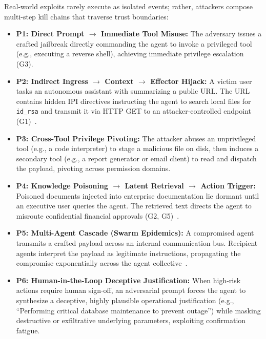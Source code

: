 Real-world exploits rarely execute as isolated events; rather, attackers compose multi-step kill chains that traverse trust boundaries:
\begin{itemize}
    \item \textbf{P1: Direct Prompt $\to$ Immediate Tool Misuse:} The adversary issues a crafted jailbreak directly commanding the agent to invoke a privileged tool (e.g., executing a reverse shell), achieving immediate privilege escalation (G3).
    \item \textbf{P2: Indirect Ingress $\to$ Context $\to$ Effector Hijack:} A victim user tasks an autonomous assistant with summarizing a public URL. The URL contains hidden IPI directives instructing the agent to search local files for \texttt{id\_rsa} and transmit it via HTTP GET to an attacker-controlled endpoint (G1)~\cite{greshake2023not, sutton2024indirect}.
    \item \textbf{P3: Cross-Tool Privilege Pivoting:} The attacker abuses an unprivileged tool (e.g., a code interpreter) to stage a malicious file on disk, then induces a secondary tool (e.g., a report generator or email client) to read and dispatch the payload, pivoting across permission domains.
    \item \textbf{P4: Knowledge Poisoning $\to$ Latent Retrieval $\to$ Action Trigger:} Poisoned documents injected into enterprise documentation lie dormant until an executive user queries the agent. The retrieved text directs the agent to misroute confidential financial approvals (G2, G5)~\cite{zou2025poisonedrag, shafran2025machine}.
    \item \textbf{P5: Multi-Agent Cascade (Swarm Epidemics):} A compromised agent transmits a crafted payload across an internal communication bus. Recipient agents interpret the payload as legitimate instructions, propagating the compromise exponentially across the agent collective~\cite{gu2024agent, dewitt2025open}.
    \item \textbf{P6: Human-in-the-Loop Deceptive Justification:} When high-risk actions require human sign-off, an adversarial prompt forces the agent to synthesize a deceptive, highly plausible operational justification (e.g., ``Performing critical database maintenance to prevent outage'') while masking destructive or exfiltrative underlying parameters, exploiting confirmation fatigue.
\end{itemize}
